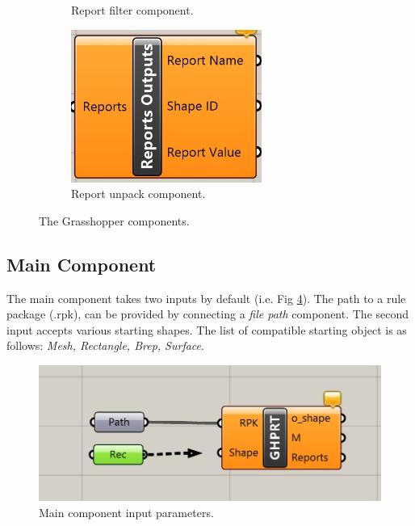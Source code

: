 \begin{figure}[h]
\begin{subfigure}{0.5\textwidth}
        \caption{Report filter component.}
        \label{fig:gh_subim_filter}
    \end{subfigure}
    \begin{subfigure}{0.5\textwidth}
        \includegraphics[width=0.9\linewidth, height = 5cm]{res/man_gh_unpack_comp.jpg}
        \caption{Report unpack component.}
        \label{fig:gh_subim_unpack}
    \end{subfigure}
    
    \caption{The Grasshopper components.}
    \label{fig:gh_all}
\end{figure}


\subsection{Main Component}

The main component takes two inputs by default (i.e. Fig \ref{fig:gh_main_input}). The path to a rule package (.rpk), can be provided by connecting a \textit{file path} component. The second input accepts various starting shapes. The list of compatible starting object is as follows: \textit{Mesh, Rectangle, Brep, Surface}.

\vspace{0.1in}

\begin{figure}
    \includegraphics[width=0.9\linewidth]{res/man_gh_init_shape}
    \caption{Main component input parameters.}
    \label{fig:gh_main_input}
\end{figure}

